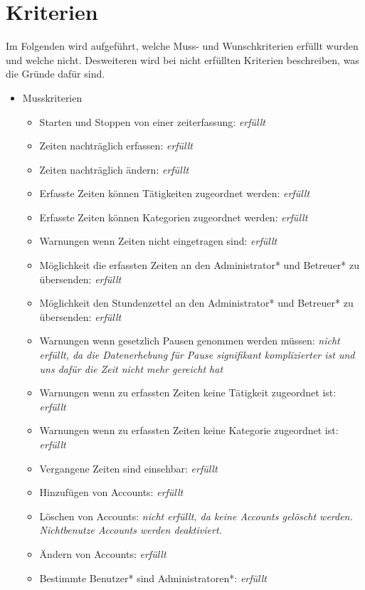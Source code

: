 \section{Kriterien}
Im Folgenden wird aufgeführt, welche Muss- und Wunschkriterien erfüllt wurden und welche nicht. Desweiteren wird bei nicht erfüllten Kriterien beschreiben, was die Gründe dafür sind.

\begin{itemize}
  \item Musskriterien
    \begin{itemize}
      \item Starten und Stoppen von einer zeiterfassung: \emph{erfüllt}
      \item Zeiten nachträglich erfassen: \emph{erfüllt} 
      \item Zeiten nachträglich ändern: \emph{erfüllt}
      \item Erfasste Zeiten können Tätigkeiten zugeordnet werden: \emph{erfüllt}
      \item Erfasste Zeiten können Kategorien zugeordnet werden: \emph{erfüllt}
      \item Warnungen wenn Zeiten nicht eingetragen sind: \emph{erfüllt}
      \item Möglichkeit die erfassten Zeiten an den Administrator* und Betreuer* zu übersenden: \emph{erfüllt}
	    \item Möglichkeit den Stundenzettel an den Administrator* und Betreuer* zu übersenden: \emph{erfüllt}
	    \item Warnungen wenn gesetzlich Pausen genommen werden müssen: \emph{nicht erfüllt, da die Datenerhebung für Pause signifikant komplizierter ist und uns dafür die Zeit nicht mehr gereicht hat}
	    \item Warnungen wenn zu erfassten Zeiten keine Tätigkeit zugeordnet ist: \emph{erfüllt}
	    \item Warnungen wenn zu erfassten Zeiten keine Kategorie zugeordnet ist: \emph{erfüllt}
	    \item Vergangene Zeiten sind einsehbar: \emph{erfüllt}
    	\item Hinzufügen von Accounts: \emph{erfüllt}
    	\item Löschen von Accounts: \emph{nicht erfüllt, da keine Accounts gelöscht werden. Nichtbenutze Accounts werden deaktiviert.}
    	\item Ändern von Accounts: \emph{erfüllt}
    	\item Bestimmte Benutzer* sind Administratoren*: \emph{erfüllt}

\end{itemize}
\end{itemize}

